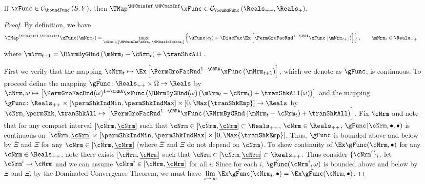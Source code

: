 \documentclass[\econtexRoot/BufferStockTheory]{subfiles}
\begin{document}
\begin{claim}\label{clm:hiraguchi_cont}
If $\xFunc\in  \mathcal{C}_{\boundFunc }\left( S,Y\right)$, then $\TMap^{\MPCminInf, \MPCmaxInf}{\mathfrak{\xFunc}}\in \mathcal{C}_{\boundFunc }\left(\Reals_{++}, \Reals_{+}\right)$. 
\end{claim}
%
\begin{proof}
By definition, we have
%
\begin{align}
  \TMap^{\MPCminInf, \MPCmaxInf}{\mathfrak{\xFunc}}(\mNrm_{t}) & = \underset{\cNrm_{t} \in
                                            [\MPCminInf \mNrm_{t}, \MPCmaxInf \mNrm_{t}]
                                            }\max \left\{
                                            \uFunc(c_{t})+\DiscFac \Ex\left[ {\PermGroFacRnd}^{1-\CRRA }{\mathfrak{\xFunc}}
                                            \left( {\mNrm}_{t+1}\right) \right] \right\}, \qquad \mNrm_{t}\in \Reals_{++}  %
\end{align}
%
where ${\mNrm}_{t+1} = \RNrmByGRnd\left(\mNrm_{t} - \cNrm_{t}\right) + \tranShkAll$.

First we verify that the mapping $\cNrm_{t}\mapsto \Ex\left[ {\PermGroFacRnd}^{1-\CRRA }{\mathfrak{\xFunc}}
                                            \left( {\mNrm}_{t+1}\right) \right]$, which we denote as $\gFunc$,  is continuous.
To proceed define the mapping $\tilde{\gFunc}\colon \Reals_{++}\times\Omega\rightarrow \Reals$ by $\cNrm, \omega \mapsto\left[ {\PermGroFacRnd}(\omega)^{1-\CRRA }{\mathfrak{\xFunc}}
                                            \left( \RNrmByGRnd(\omega)\left(\mNrm_{t} - \cNrm_{t}\right) + \tranShkAll(\omega)\right) \right]$ and the mapping $\gFunc\colon \Reals_{++}\times[\permShkIndMin,\permShkIndMax]\times [0,\Max{\tranShkEmp}] \rightarrow \Reals$ by $\cNrm, \permShk,\tranShkAll \mapsto\left[ {\PermGroFacRnd}^{1-\CRRA }{\mathfrak{\xFunc}}
                                            \left( \RNrmByGRnd\left(\mNrm_{t} - \cNrm_{t}\right) + \tranShkAll\right) \right]$.
Fix $\cNrm$ and note that for any compact interval $[\bar{\cNrm},\underline{\cNrm}]$ such that $\cNrm\in [\bar{\cNrm},\underline{\cNrm}]\subset \Reals_{++}$, $\cNrm\in \Reals_{++}$, $\gFunc(\cNrm,\bullet,\bullet)$ is continuous on $[\bar{\cNrm},\underline{\cNrm}]\times[\permShkIndMin,\permShkIndMax]\times [0,\Max{\tranShkEmp}]$.
Thus, $\gFunc$ is bounded above and below by $\bar{\Xi}$ and $\underline{\Xi}$ for any $\cNrm\in [\bar{\cNrm},\underline{\cNrm}]$ (where $\bar{\Xi}$ and $\underline{\Xi}$ do not depend on $\cNrm$).
To show continuity of $\Ex \tilde{\gFunc}(\cNrm,\bullet)$ for any $\cNrm \in \Reals_{++}$, note there exists  $[\bar{\cNrm},\underline{\cNrm}]$ such that $\cNrm\in [\bar{\cNrm},\underline{\cNrm}]\subset \Reals_{++}$.
Thus consider $\{\cNrm^{i}\}_{i}$, let $\cNrm^{i}\rightarrow \cNrm$ and we can assume $\cNrm^{i}\in [\bar{\cNrm},\underline{\cNrm}]$ for all $i$.
Since for each $i$, $\tilde{\gFunc}(\cNrm^{i},\omega)$ is bounded above and below by $\bar{\Xi}$ and $\underline{\Xi}$, by the Dominated Convergence Theorem, we must have $\lim\limits_{i\rightarrow \infty}\Ex \tilde{\gFunc}(\cNrm_{i},\bullet) = \Ex \tilde{\gFunc}(\cNrm,\bullet)$.


\end{proof}
\end{document}
